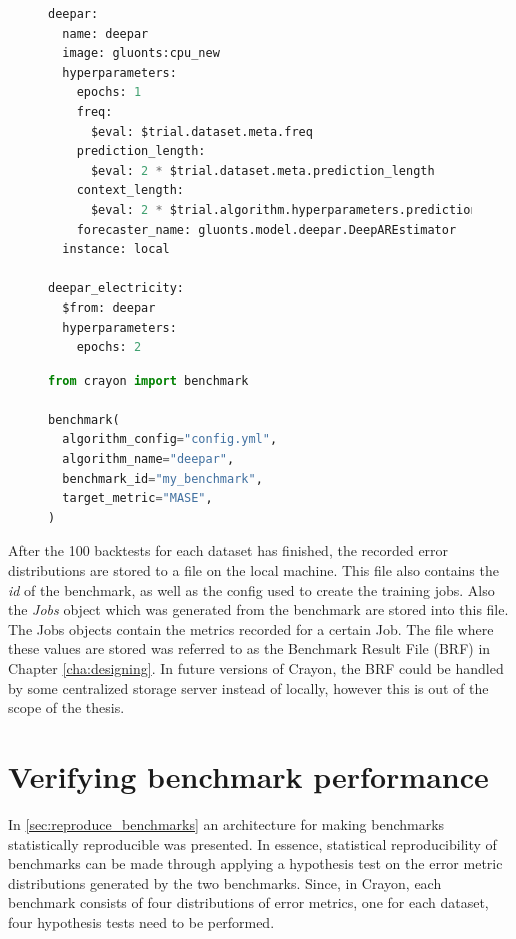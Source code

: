 \begin{figure}
  \begin{lstlisting}[language=Python, label={config:benchmarking}, caption={Config file for benchmarking with Crayon. Note that \textit{deepar\_electricity} has a different hyperparameter configuration thus these hyperparameters are used when benchmarking the algorithm on the electricity dataset. For all other datasets, the default algorithm definition \textit{deepar} is used.}]
deepar:
  name: deepar
  image: gluonts:cpu_new
  hyperparameters:
    epochs: 1
    freq:
      $eval: $trial.dataset.meta.freq
    prediction_length:
      $eval: 2 * $trial.dataset.meta.prediction_length
    context_length:
      $eval: 2 * $trial.algorithm.hyperparameters.prediction_length
    forecaster_name: gluonts.model.deepar.DeepAREstimator    
  instance: local

deepar_electricity:
  $from: deepar
  hyperparameters:
    epochs: 2
    \end{lstlisting}

  \begin{lstlisting}[language=Python, label={code:benchmarking}, caption={Python script for starting a benchmarking run using Crayon.}]
from crayon import benchmark

benchmark(
  algorithm_config="config.yml",
  algorithm_name="deepar",
  benchmark_id="my_benchmark",
  target_metric="MASE",
)
    \end{lstlisting}
\end{figure}

After the 100 backtests for each dataset has finished, the recorded error distributions are stored to a file on the local machine. This file also contains the \textit{id} of the benchmark, as well as the config used to create the training jobs. Also the \textit{Jobs} object which was generated from the benchmark are stored into this file. The Jobs objects contain the metrics recorded for a certain Job. The file where these values are stored was referred to as the Benchmark Result File (BRF) in Chapter \ref{cha:designing}. In future versions of Crayon, the BRF could be handled by some centralized storage server instead of locally, however this is out of the scope of the thesis.

\section{Verifying benchmark performance}
In \ref{sec:reproduce_benchmarks} an architecture for making benchmarks statistically reproducible was presented. In essence, statistical reproducibility of benchmarks can be made through applying a hypothesis test on the error metric distributions generated by the two benchmarks. Since, in Crayon, each benchmark consists of four distributions of error metrics, one for each dataset, four hypothesis tests need to be performed.

